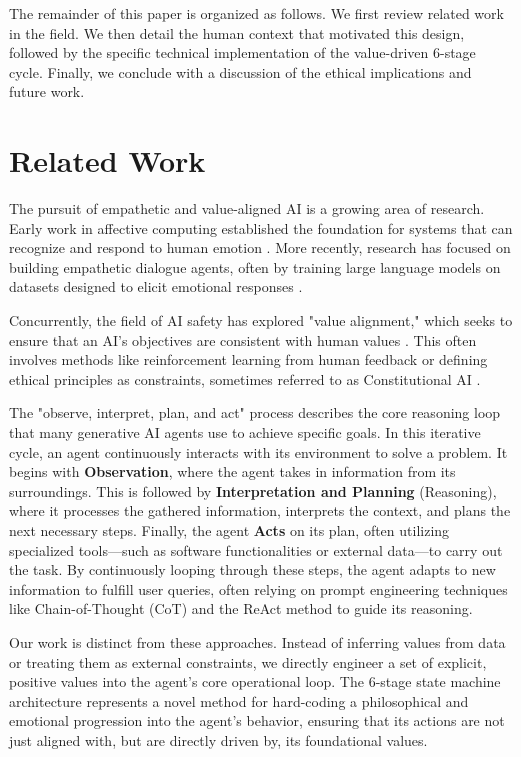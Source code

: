 \documentclass[letterpaper]{article}
\begin{document}
The remainder of this paper is organized as follows. We first review related work in the field. We then detail the human context that motivated this design, followed by the specific technical implementation of the value-driven 6-stage cycle. Finally, we conclude with a discussion of the ethical implications and future work.

\section{Related Work}
The pursuit of empathetic and value-aligned AI is a growing area of research. Early work in affective computing established the foundation for systems that can recognize and respond to human emotion \citep{picard1995affective}. More recently, research has focused on building empathetic dialogue agents, often by training large language models on datasets designed to elicit emotional responses \citep{rashkin2018towards, zhou2018empathetic}.

Concurrently, the field of AI safety has explored "value alignment," which seeks to ensure that an AI's objectives are consistent with human values \citep{amodei2016concrete}. This often involves methods like reinforcement learning from human feedback or defining ethical principles as constraints, sometimes referred to as Constitutional AI \citep{bai2022constitutional, hendrycks2021aligning}.

The "observe, interpret, plan, and act" process describes the core reasoning loop that many generative AI agents use to achieve specific goals. In this iterative cycle, an agent continuously interacts with its environment to solve a problem. It begins with \textbf{Observation}, where the agent takes in information from its surroundings. This is followed by \textbf{Interpretation and Planning} (Reasoning), where it processes the gathered information, interprets the context, and plans the next necessary steps. Finally, the agent \textbf{Acts} on its plan, often utilizing specialized tools—such as software functionalities or external data—to carry out the task. By continuously looping through these steps, the agent adapts to new information to fulfill user queries, often relying on prompt engineering techniques like Chain-of-Thought (CoT) \citep{wei2022chain} and the ReAct method \citep{yao2022react} to guide its reasoning.

Our work is distinct from these approaches. Instead of inferring values from data or treating them as external constraints, we directly engineer a set of explicit, positive values into the agent's core operational loop. The 6-stage state machine architecture represents a novel method for hard-coding a philosophical and emotional progression into the agent's behavior, ensuring that its actions are not just aligned with, but are directly driven by, its foundational values.
\end{document}
